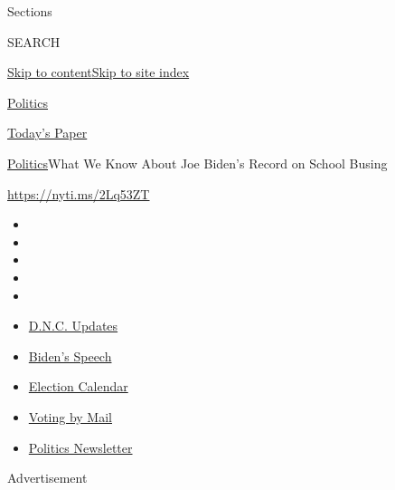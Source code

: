 Sections

SEARCH

\protect\hyperlink{site-content}{Skip to
content}\protect\hyperlink{site-index}{Skip to site index}

\href{https://www.nytimes3xbfgragh.onion/section/politics}{Politics}

\href{https://myaccount.nytimes3xbfgragh.onion/auth/login?response_type=cookie\&client_id=vi}{}

\href{https://www.nytimes3xbfgragh.onion/section/todayspaper}{Today's
Paper}

\href{/section/politics}{Politics}\textbar{}What We Know About Joe
Biden's Record on School Busing

\url{https://nyti.ms/2Lq53ZT}

\begin{itemize}
\item
\item
\item
\item
\item
\end{itemize}

\begin{itemize}
\item
  \href{https://www.nytimes3xbfgragh.onion/live/2020/08/21/us/dnc-convention-election?action=click\&pgtype=Article\&state=default\&region=TOP_BANNER\&context=storylines_menu}{D.N.C.
  Updates}
\item
  \href{https://www.nytimes3xbfgragh.onion/2020/08/20/us/politics/biden-presidential-nomination-dnc.html?action=click\&pgtype=Article\&state=default\&region=TOP_BANNER\&context=storylines_menu}{Biden's
  Speech}
\item
  \href{https://www.nytimes3xbfgragh.onion/interactive/2019/us/elections/2020-presidential-election-calendar.html?action=click\&pgtype=Article\&state=default\&region=TOP_BANNER\&context=storylines_menu}{Election
  Calendar}
\item
  \href{https://www.nytimes3xbfgragh.onion/interactive/2020/08/11/us/politics/vote-by-mail-us-states.html?action=click\&pgtype=Article\&state=default\&region=TOP_BANNER\&context=storylines_menu}{Voting
  by Mail}
\item
  \href{https://www.nytimes3xbfgragh.onion/newsletters/politics?action=click\&pgtype=Article\&state=default\&region=TOP_BANNER\&context=storylines_menu}{Politics
  Newsletter}
\end{itemize}

Advertisement

